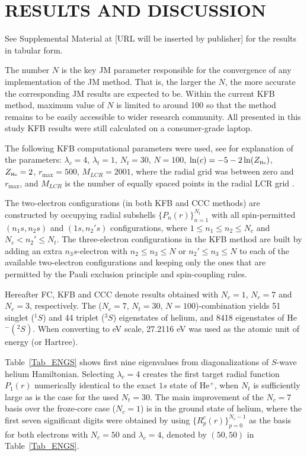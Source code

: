 \documentclass[aip
, pra
, showpacs
, aps
, twocolumn
, groupedaddress
, floatfix
]{revtex4}
\begin{document}
\section{RESULTS AND DISCUSSION}

See Supplemental Material at [URL will be inserted by publisher] for the results in tabular form.

The number $N$ is the key JM parameter responsible for the convergence of any implementation of the JM method.
That is, the larger the $N$, the more accurate the corresponding JM results are expected to be.
Within the current KFB method, maximum value of $N$ is limited to around 100 so that the method remains to be easily accessible
to wider research community. All presented in this study KFB results were still calculated on a consumer-grade laptop.


The following KFB computational parameters were used, see \cite{KB10p022708} for explanation of the parameters:
$\lambda_c=4$, $\lambda_t=1$, $N_t=30$, $N=100$, $\ln(c)=-5 - 2\ln(Z_{\mbox{\tiny{He}}} )$, $Z_{\mbox{\tiny{He}}}=2$, $r_{\max}=500$,
$M_{LCR}=2001$, where the radial grid was between zero and $r_{\max}$, and
$M_{LCR}$ is the number of equally spaced points in the radial LCR grid \cite{KB10p022708}.

The two-electron configurations (in both KFB and CCC methods) are constructed by occupying  radial subshells $\{P_n(r)\}_{n=1}^{N_t}$
with all spin-permitted $(n_1s,n_2s)$ and $(1s,n_2's)$ configurations,
where $1 \leq n_1 \leq n_2 \leq N_c$ and $N_c<n_2' \leq N_t$.
The three-electron configurations in the KFB method are built by adding an extra $n_3s$-electron with
$ n_2 \leq n_3 \leq N$ or $ n_2' \leq n_3 \leq N$ to each of the available two-electron configurations and keeping only the ones that are permitted by the Pauli exclusion principle and spin-coupling rules.


Hereafter FC, KFB and CCC denote results obtained with $N_c=1$, $N_c=7$ and $N_c=3$, respectively.
The ($N_c=7$, $N_t=30$, $N=100$)-combination yields 51 singlet ($^1S$) and 44 triplet ($^3S$) eigenstates of helium, and 8418 eigenstates of He$^-(^2S)$.
When converting to eV scale, 27.2116 eV was used as the atomic unit of energy (or Hartree).


Table~\ref{Tab_ENGS} shows first nine eigenvalues from diagonalizations of $S$-wave helium Hamiltonian.
Selecting $\lambda_c=4$ creates the first target radial function $P_1(r)$ numerically identical to the exact $1s$ state of He$^+$,
when $N_t$ is sufficiently large as is the case for the used $N_t=30$.
The main improvement of the $N_c=7$ basis over the froze-core case ($N_c=1$) is in the ground state of helium, where
the first seven significant digits \cite{G94} were obtained by using  $\{R^{c}_p(r)\}_{p=0}^{N_c-1}$ as the basis for both electrons with $N_c=50$ and $\lambda_c=4$, denoted by $(50,50)$ in Table~\ref{Tab_ENGS}.
\end{document}

